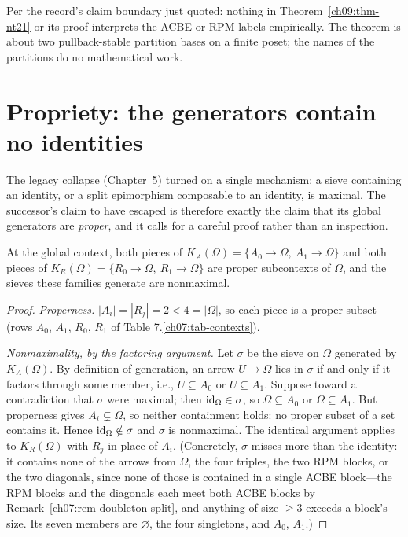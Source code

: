 \begin{boundary}\label{ch09:boundary-nt21}
Per the record's claim boundary just quoted: nothing in Theorem~\ref{ch09:thm-nt21} or its proof interprets the ACBE or RPM labels empirically. The theorem is about two pullback-stable partition bases on a finite poset; the names of the partitions do no mathematical work.
\end{boundary}

\section{Propriety: the generators contain no identities}\label{ch09:sec-proper}

The legacy collapse (Chapter~5) turned on a single mechanism: a sieve containing an identity, or a split epimorphism composable to an identity, is maximal. The successor's claim to have escaped is therefore exactly the claim that its global generators are \emph{proper}, and it calls for a careful proof rather than an inspection.

\begin{proposition}\label{ch09:prop-proper}
At the global context, both pieces of $K_{A}(\Omega)=\{A_{0}\to\Omega,\ A_{1}\to\Omega\}$ and both pieces of $K_{R}(\Omega)=\{R_{0}\to\Omega,\ R_{1}\to\Omega\}$ are proper subcontexts of $\Omega$, and the sieves these families generate are nonmaximal.
\end{proposition}

\begin{proof}
\emph{Properness.} $|A_{i}|=|R_{j}|=2<4=|\Omega|$, so each piece is a proper subset (rows $A_{0}$, $A_{1}$, $R_{0}$, $R_{1}$ of Table 7.\ref{ch07:tab-contexts}).

\emph{Nonmaximality, by the factoring argument.} Let $\sigma$ be the sieve on $\Omega$ generated by $K_{A}(\Omega)$. By definition of generation, an arrow $U\to\Omega$ lies in $\sigma$ if and only if it factors through some member, i.e., $U\subseteq A_{0}$ or $U\subseteq A_{1}$. Suppose toward a contradiction that $\sigma$ were maximal; then $\mathrm{id}_{\Omega}\in\sigma$, so $\Omega\subseteq A_{0}$ or $\Omega\subseteq A_{1}$. But properness gives $A_{i}\subsetneq\Omega$, so neither containment holds: no proper subset of a set contains it. Hence $\mathrm{id}_{\Omega}\notin\sigma$ and $\sigma$ is nonmaximal. The identical argument applies to $K_{R}(\Omega)$ with $R_{j}$ in place of $A_{i}$. (Concretely, $\sigma$ misses more than the identity: it contains none of the arrows from $\Omega$, the four triples, the two RPM blocks, or the two diagonals, since none of those is contained in a single ACBE block---the RPM blocks and the diagonals each meet both ACBE blocks by Remark~\ref{ch07:rem-doubleton-split}, and anything of size $\ge 3$ exceeds a block's size. Its seven members are $\varnothing$, the four singletons, and $A_{0}$, $A_{1}$.)
\end{proof}

